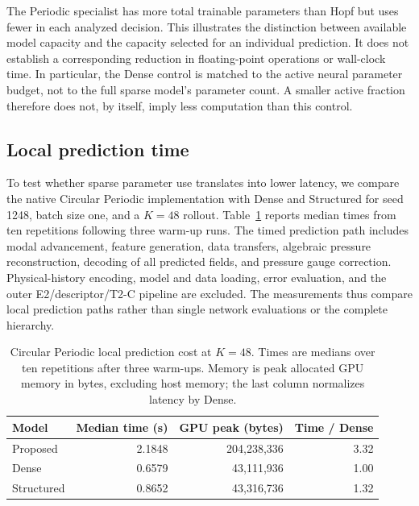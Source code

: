 The Periodic specialist has more total trainable parameters than Hopf
but uses fewer in each analyzed decision. This illustrates the
distinction between available model capacity and the capacity selected
for an individual prediction. It does not establish a corresponding
reduction in floating-point operations or wall-clock time. In particular,
the Dense control is matched to the active neural parameter budget,
not to the full sparse model's parameter count. A smaller active fraction
therefore does not, by itself, imply less computation than this control.

\subsection{Local prediction time}
\label{app:cost_local_latency}

To test whether sparse parameter use translates into lower latency,
we compare the native Circular Periodic implementation with Dense and
Structured for seed 1248, batch size one, and a $K=48$ rollout.
Table~\ref{tab:local_latency} reports median times from ten repetitions
following three warm-up runs. The timed prediction path includes modal
advancement, feature generation, data transfers, algebraic pressure
reconstruction, decoding of all predicted fields, and pressure gauge
correction. Physical-history encoding, model and data loading, error
evaluation, and the outer E2/descriptor/T2-C pipeline are excluded.
The measurements thus compare local prediction paths rather than
single network evaluations or the complete hierarchy.

\begin{table}[tbp]
\centering\small
\caption{Circular Periodic local prediction cost at $K=48$.
Times are medians over ten repetitions after three warm-ups.
Memory is peak allocated GPU memory in bytes, excluding host memory;
the last column normalizes latency by Dense.}
\label{tab:local_latency}
\begin{tabular}{@{}lrrr@{}}
\toprule
Model & Median time (s) & GPU peak (bytes) & Time / Dense\\
\midrule
Proposed & 2.1848 & 204,238,336 & 3.32\\
Dense & 0.6579 & 43,111,936 & 1.00\\
Structured & 0.8652 & 43,316,736 & 1.32\\
\bottomrule
\end{tabular}
\end{table}

